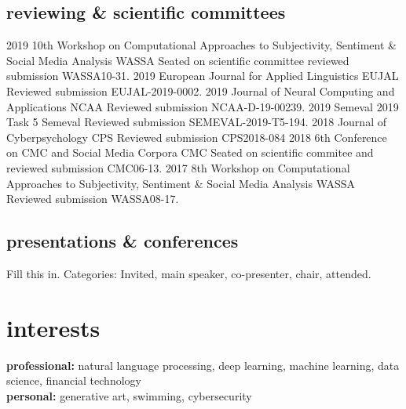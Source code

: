 \documentclass[]{friggeri-cv-a4}
\begin{document}
\subsection{reviewing \& scientific committees}
\begin{entrylist}
    \entry
        {2019}
        {10th Workshop on Computational Approaches to Subjectivity, Sentiment \& Social Media Analysis}
        {WASSA}
        {Seated on scientific committee reviewed submission WASSA10-31.}
    \entry
        {2019}
        {European Journal for Applied Linguistics}
        {EUJAL}
        {Reviewed submission EUJAL-2019-0002.}
    \entry
        {2019}
        {Journal of Neural Computing and Applications}
        {NCAA}
        {Reviewed submission NCAA-D-19-00239.}
    \entry
        {2019}
        {Semeval 2019 Task 5}
        {Semeval}
        {Reviewed submission SEMEVAL-2019-T5-194.}
    \entry
        {2018}
        {Journal of Cyberpsychology}
        {CPS}
        {Reviewed submission CPS2018-084}
    \entry
        {2018}
        {6th Conference on CMC and Social Media Corpora}
        {CMC}
        {Seated on scientific commitee and reviewed submission CMC06-13.}
    \entry
        {2017}
        {8th Workshop on Computational Approaches to Subjectivity, Sentiment \& Social Media Analysis}
        {WASSA}
        {Reviewed submission WASSA08-17.}
\end{entrylist}

\subsection{presentations \& conferences}
Fill this in. Categories: Invited, main speaker, co-presenter, chair, attended.

\section{interests}

\textbf{professional:} natural language processing, deep learning, machine learning, data science, financial technology \\
\textbf{personal:} generative art, swimming, cybersecurity

\end{document}
